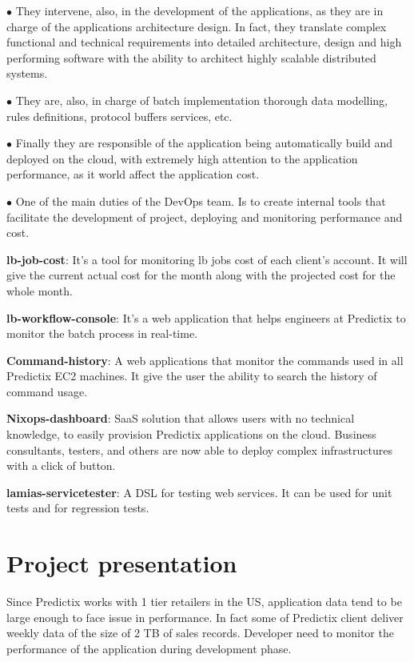 $\bullet$ They intervene, also, in the development of the applications, as they are in
charge of the applications architecture design. In fact, they translate complex
functional and technical requirements into detailed architecture, design and
high performing software with the ability to architect highly scalable
distributed systems.

$\bullet$ They are, also, in charge of batch implementation thorough data modelling, rules
definitions, protocol buffers services, etc.

$\bullet$ Finally they are responsible of the application being automatically build and
deployed on the cloud, with extremely high attention to the application
performance, as it world affect the application cost.

$\bullet$ One of the main duties of the DevOps team. Is to create internal
tools that facilitate the development of project, deploying and monitoring
performance and cost.

\textbf{lb-job-cost}: It's a tool for monitoring lb jobs cost of each client's account.
It will give the current actual cost for the month along with the projected cost
for the whole month.

\textbf{lb-workflow-console}: It's a web application that helps engineers at Predictix to monitor
the batch process in real-time.

\textbf{Command-history}: A web applications that monitor the commands used in all
Predictix EC2 machines. It give the user the ability to search the history of command
usage.

\textbf{Nixops-dashboard}:
SaaS solution that allows users with no technical knowledge, to easily provision
Predictix applications on the cloud.  Business consultants, testers, and others are
now able to deploy complex infrastructures with a click of button.

\textbf{lamias-servicetester}: A DSL for testing web services. It can be used for unit
tests and for regression tests.

\section{Project presentation}

Since Predictix works with 1 tier retailers in the US, application data tend to
be large enough to face issue in performance. In fact some of Predictix client
deliver weekly data of the size of 2 TB of sales records. 
Developer need to monitor the performance of the application during development
phase.

